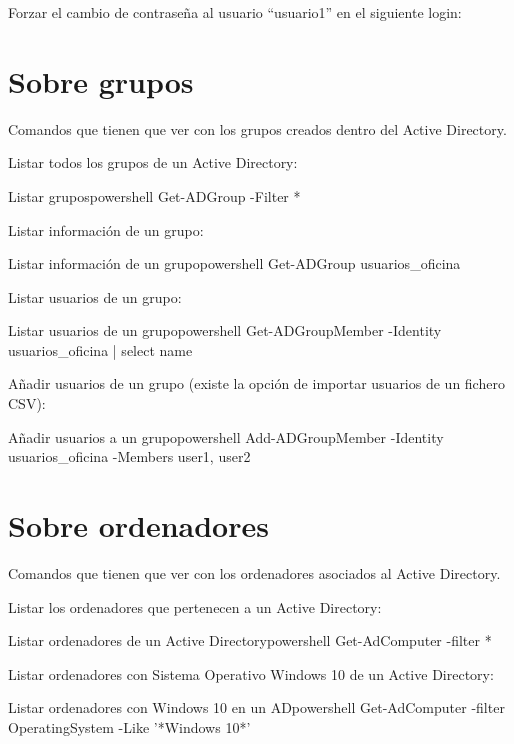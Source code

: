 Forzar el cambio de contraseña al usuario “usuario1” en el siguiente login:


\section{Sobre grupos}
Comandos que tienen que ver con los grupos creados dentro del Active Directory.

Listar todos los grupos de un Active Directory:
\begin{mycode}{Listar grupos}{powershell}{}
Get-ADGroup -Filter *
\end{mycode}

Listar información de un grupo:
\begin{mycode}{Listar información de un grupo}{powershell}{}
Get-ADGroup usuarios_oficina
\end{mycode}

Listar usuarios de un grupo:
\begin{mycode}{Listar usuarios de un grupo}{powershell}{}
Get-ADGroupMember -Identity usuarios_oficina | select name
\end{mycode}

Añadir usuarios de un grupo (existe la opción de importar usuarios de un fichero CSV):
\begin{mycode}{Añadir usuarios a un grupo}{powershell}{}
Add-ADGroupMember -Identity usuarios_oficina -Members user1, user2
\end{mycode}


\section{Sobre ordenadores}
Comandos que tienen que ver con los ordenadores asociados al Active Directory.

Listar los ordenadores que pertenecen a un Active Directory:
\begin{mycode}{Listar ordenadores de un Active Directory}{powershell}{}
Get-AdComputer -filter *
\end{mycode}


Listar ordenadores con Sistema Operativo Windows 10 de un Active Directory:
\begin{mycode}{Listar ordenadores con Windows 10 en un AD}{powershell}{}
Get-AdComputer -filter  {OperatingSystem -Like '*Windows 10*'}
\end{mycode}


